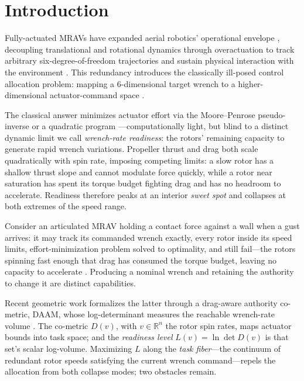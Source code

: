 \documentclass[letter, 10 pt, journal, twoside]{IEEEtran}
\theoremstyle{compact}
\begin{document}
\section{Introduction}
\label{sec:introduction}

Fully-actuated \acfp{MRAV} have expanded aerial robotics' operational envelope \cite{Hamandi2021, Rashad2020}, decoupling translational and rotational dynamics through overactuation to track arbitrary six-degree-of-freedom trajectories and sustain physical interaction with the environment \cite{Ollero2022}. This redundancy introduces the classically ill-posed control allocation problem: mapping a $6$-dimensional target wrench to a higher-dimensional actuator-command space \cite{Johansen2013}.

The classical answer minimizes actuator effort via the Moore--Penrose pseudo-inverse or a quadratic program \cite{Johansen2013}---computationally light, but blind to a distinct dynamic limit we call \emph{wrench-rate readiness}: the rotors' remaining capacity to generate rapid wrench variations. Propeller thrust and drag both scale quadratically with spin rate, imposing competing limits: a slow rotor has a shallow thrust slope and cannot modulate force quickly, while a rotor near saturation has spent its torque budget fighting drag and has no headroom to accelerate. Readiness therefore peaks at an interior \emph{sweet spot} and collapses at both extremes of the speed range.

Consider an articulated \ac{MRAV} holding a contact force against a wall when a gust arrives: it may track its commanded wrench exactly, every rotor inside its speed limits, effort-minimization problem solved to optimality, and still fail---the rotors spinning fast enough that drag has consumed the torque budget, leaving no capacity to accelerate \cite{Bicego2020, Franchi2026aeropromptness}. Producing a nominal wrench and retaining the authority to change it are distinct capabilities.

Recent geometric work formalizes the latter through a drag-aware authority co-metric, \acf{DAAM}, whose log-determinant measures the reachable wrench-rate volume \cite{Franchi2026aeropromptness, FranchiVADA}. %
The co-metric $D(v)$, with $v \in \mathbb{R}^n$ the rotor spin rates, maps actuator bounds into task space; and the \emph{readiness level} $L(v)=\ln\det D(v)$ is that set's scalar log-volume. Maximizing $L$ along the \emph{task fiber}---the continuum of redundant rotor speeds satisfying the current wrench command---repels the allocation from both collapse modes; two obstacles remain.
\end{document}
